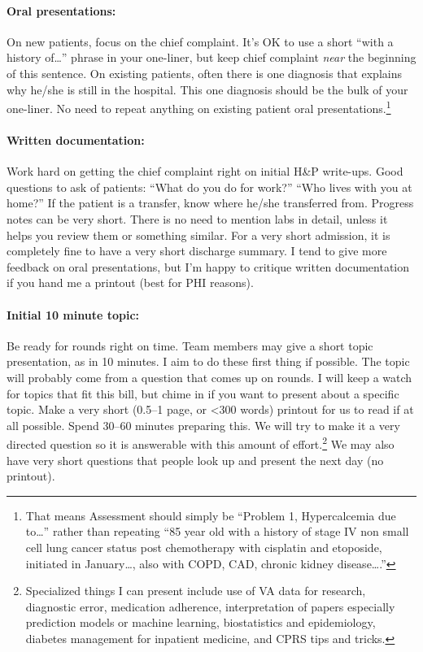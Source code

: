 \documentclass{tufte-handout}
\begin{document}
\paragraph{Oral presentations:} On new patients, focus on the chief
complaint. It's OK to use a short ``with a history of\ldots{}'' phrase
in your one-liner, but keep chief complaint \emph{near} the beginning
of this sentence. On existing patients, often there is one diagnosis
that explains why he/she is still in the hospital. This one diagnosis
should be the bulk of your one-liner. No need to repeat anything on
existing patient oral presentations.\footnote{That means Assessment
should simply be ``Problem 1, Hypercalcemia due to\ldots{}'' rather
than repeating ``85 year old with a history of stage IV non small cell
lung cancer status post chemotherapy with cisplatin and etoposide,
initiated in January\ldots{}, also with COPD, CAD, chronic kidney
disease\ldots{}.''}

\paragraph{Written documentation:} Work hard on getting the chief
complaint right on initial H\&P write-ups. Good questions to ask of
patients: ``What do you do for work?'' ``Who lives with you at home?''
If the patient is a transfer, know where he/she transferred
from. Progress notes can be very short. There is no need to mention
labs in detail, unless it helps you review them or something similar.
For a very short admission, it is completely fine to
have a very short discharge summary. I tend to give more feedback on
oral presentations, but I'm happy to critique written documentation if
you hand me a printout (best for PHI reasons).

\paragraph{Initial 10 minute topic:} Be ready for rounds right on time.
Team members may give a short topic presentation, as in 10 minutes. I
aim to do these first thing if possible. The topic will probably come
from a question that comes up on rounds. I will keep a watch for
topics that fit this bill, but chime in if you want to present about a
specific topic. Make a very short (0.5--1 page, or <300 words)
printout for us to read if at all possible. Spend 30--60 minutes
preparing this. We will try to make it a very directed question so it
is answerable with this amount of effort.\footnote{Specialized things
I can present include use of VA data for research, diagnostic error,
medication adherence, interpretation of papers especially prediction
models or machine learning, biostatistics and epidemiology, diabetes
management for inpatient medicine, and CPRS tips and tricks.} We may
also have very short questions that people look up and present the
next day (no printout).
\end{document}
